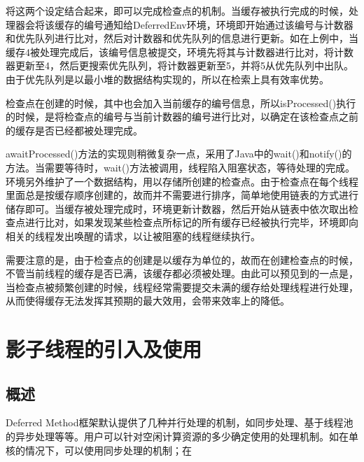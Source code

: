 将这两个设定结合起来，即可以完成检查点的机制。当缓存被执行完成的时候，处理器会将该缓存的编号通知给DeferredEnv环境，环境即开始通过该编号与计数器和优先队列进行比对，然后对计数器和优先队列的信息进行更新。如在上例中，当缓存4被处理完成后，该编号信息被提交，环境先将其与计数器进行比对，将计数器更新至4，然后更搜索优先队列，将计数器更新至5，并将5从优先队列中出队。由于优先队列是以最小堆的数据结构实现的，所以在检索上具有效率优势。

检查点在创建的时候，其中也会加入当前缓存的编号信息，所以isProcessed()执行的时候，是将检查点的编号与当前计数器的编号进行比对，以确定在该检查点之前的缓存是否已经都被处理完成。

awaitProcessed()方法的实现则稍微复杂一点，采用了Java中的wait()和notify()的方法。当需要等待时，wait()方法被调用，线程陷入阻塞状态，等待处理的完成。环境另外维护了一个数据结构，用以存储所创建的检查点。由于检查点在每个线程里面总是按缓存顺序创建的，故而并不需要进行排序，简单地使用链表的方式进行储存即可。当缓存被处理完成时，环境更新计数器，然后开始从链表中依次取出检查点进行比对，如果发现某些检查点所标记的所有缓存已经被执行完毕，环境即向相关的线程发出唤醒的请求，以让被阻塞的线程继续执行。

需要注意的是，由于检查点的创建是以缓存为单位的，故而在创建检查点的时候，不管当前线程的缓存是否已满，该缓存都必须被处理。由此可以预见到的一点是，当检查点被频繁创建的时候，线程经常需要提交未满的缓存给处理线程进行处理，从而使得缓存无法发挥其预期的最大效用，会带来效率上的降低。

\section{影子线程的引入及使用}

\subsection{概述}

Deferred Method框架默认提供了几种并行处理的机制，如同步处理、基于线程池的异步处理等等。用户可以针对空闲计算资源的多少确定使用的处理机制。如在单核的情况下，可以使用同步处理的机制；在
